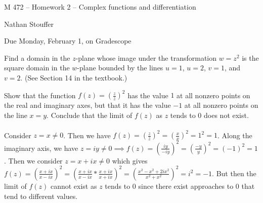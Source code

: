 \documentclass[11pt]{exam}
\newcommand{\ds}{\displaystyle}
\begin{document}
\centerline{\Large M 472 -- Homework 2 -- Complex functions and differentiation}
\vspace{1ex}
\centerline{Nathan Stouffer}
\vspace{2ex}
\centerline{Due Monday, February 1, on Gradescope}
\vspace{3ex}
\thispagestyle{empty}
\begin{questions}
\question Find a domain in the $z$-plane whose image under the
transformation $w=z^2$ is the square domain in the $w$-plane
bounded by the lines $u=1$, $u=2$, $v=1$, and $v=2$. (See
Section 14 in the textbook.)

\question Show that the function $\ds f(z) = \left( \frac{z}
{\bar{z}} \right)^2$ has the value $1$ at all nonzero points on
the real and imaginary axes, but that it has the value $-1$
at all nonzero points on the line $x=y$. Conclude that the
limit of $f(z)$ as $z$ tends to $0$ does not exist. \\\\
Consider $z = x \neq 0$.
Then we have $f(z) = \left( \frac{z}{\bar{z}} \right) ^2 = \left( \frac{x}{x} \right) ^2 = 1^2 = 1$.
Along the imaginary axis, we have $z = iy \neq 0 \implies f(z) = \left( \frac{iy}{-iy} \right) ^2 = \left( \frac{-y}{y} \right) ^2 = (-1)^2 = 1$.
Then we consider $z = x + ix \neq 0$ which gives $f(z) = \left( \frac{x + ix}{x - ix} \right) ^2 = \left( \frac{x + ix}{x - ix} * \frac{x+ix}{x+ix} \right) ^2 = \left( \frac{x^2 - x^2 + 2ix^2}{x^2 + x^2} \right) ^2 = i^2 = -1$.
But then the limit of $f(z)$ cannot exist as $z$ tends to 0 since there exist approaches to 0 that tend to different values.


\end{questions}
\end{document}

